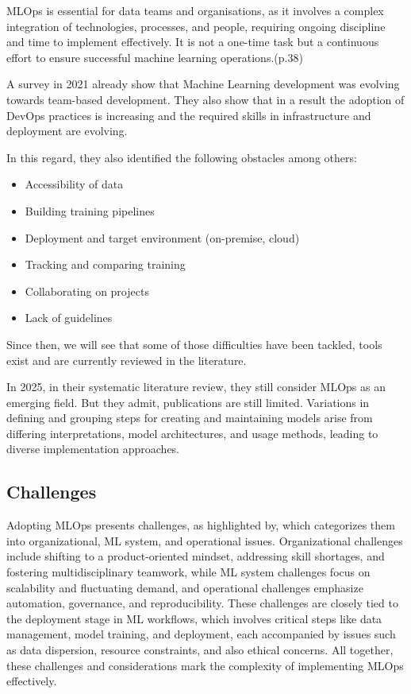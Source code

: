MLOps is essential for data teams and organisations, as it involves a complex integration of technologies, processes, and people, requiring ongoing discipline and time to implement effectively.
It is not a one-time task but a continuous effort to ensure successful machine learning operations.\cite{treveil2020introducing}(p.38)

A survey in 2021\cite{DBLP:journals/corr/abs-2103-08942} already show that Machine Learning development was evolving towards team-based development.
They also show that in a result the adoption of DevOps practices is increasing and the required skills in infrastructure and deployment are evolving.

In this regard, they also identified the following obstacles among others\cite{DBLP:journals/corr/abs-2103-08942}:
    \begin{itemize}
        \item Accessibility of data
        \item Building training pipelines
        \item Deployment and target environment (on-premise, cloud)
        \item Tracking and comparing training
        \item Collaborating on projects
        \item Lack of guidelines
    \end{itemize}

Since then, we will see that some of those difficulties have been tackled, tools exist and are currently reviewed in the literature.

In 2025, in their systematic literature review\cite{10855428}, they still consider MLOps as an emerging field.
But they admit, publications are still limited.
Variations in defining and grouping steps for creating and maintaining models arise from differing interpretations,
model architectures, and usage methods, leading to diverse implementation approaches.

\subsection{Challenges}\label{subsec:challenges}

Adopting MLOps presents challenges, as highlighted by\cite{Kreuzberger2022MachineLO}, which categorizes them into organizational,
ML system, and operational issues.
Organizational challenges include shifting to a product-oriented mindset, addressing skill shortages,
and fostering multidisciplinary teamwork, while ML system challenges focus on scalability and fluctuating demand,
and operational challenges emphasize automation, governance, and reproducibility.
These challenges are closely tied to the deployment stage in ML workflows, which involves critical steps like data management,
model training, and deployment, each accompanied by issues such as data dispersion, resource constraints, and also ethical concerns\cite{10.1145/3533378}.
All together, these challenges and considerations mark the complexity of implementing MLOps effectively.

